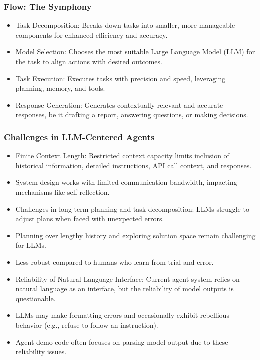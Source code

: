 \begin{frame}[fragile]\frametitle{Flow: The Symphony}
  \begin{itemize}
    \item Task Decomposition: Breaks down tasks into smaller, more manageable components for enhanced efficiency and accuracy.
    \item Model Selection: Chooses the most suitable Large Language Model (LLM) for the task to align actions with desired outcomes.
    \item Task Execution: Executes tasks with precision and speed, leveraging planning, memory, and tools.
    \item Response Generation: Generates contextually relevant and accurate responses, be it drafting a report, answering questions, or making decisions.
  \end{itemize}
\end{frame}

\begin{frame}[fragile]\frametitle{Challenges in LLM-Centered Agents}
  \begin{itemize}

    \item Finite Context Length: Restricted context capacity limits inclusion of historical information, detailed instructions, API call context, and responses.
    \item System design works with limited communication bandwidth, impacting mechanisms like self-reflection.
    \item Challenges in long-term planning and task decomposition: LLMs struggle to adjust plans when faced with unexpected errors.
    \item Planning over lengthy history and exploring solution space remain challenging for LLMs.
    \item Less robust compared to humans who learn from trial and error.
    \item Reliability of Natural Language Interface: Current agent system relies on natural language as an interface, but the reliability of model outputs is questionable.
    \item LLMs may make formatting errors and occasionally exhibit rebellious behavior (e.g., refuse to follow an instruction).
    \item Agent demo code often focuses on parsing model output due to these reliability issues.
  \end{itemize}
\end{frame}


